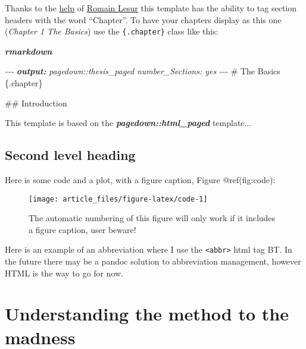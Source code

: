 \documentclass[
]{article}
\newenvironment{Shaded}{\begin{snugshade}}{\end{snugshade}}
\newcommand{\AnnotationTok}[1]{\textcolor[rgb]{0.56,0.35,0.01}{\textbf{\textit{#1}}}}
\newcommand{\CommentTok}[1]{\textcolor[rgb]{0.56,0.35,0.01}{\textit{#1}}}
\newcommand{\FunctionTok}[1]{\textcolor[rgb]{0.00,0.00,0.00}{#1}}
\newcommand{\InformationTok}[1]{\textcolor[rgb]{0.56,0.35,0.01}{\textbf{\textit{#1}}}}
\newcommand{\NormalTok}[1]{#1}
\begin{document}
Thanks to the
\href{https://github.com/rstudio/pagedown/issues/101}{help} of
\href{https://github.com/RLesur}{Romain Lesur} this template has the
ability to tag section headers with the word ``Chapter''. To have your
chapters display as this one (\emph{Chapter 1 The Basics}) use the
\texttt{\{.chapter\}} class like this:

\emph{\textbf{rmarkdown}}

\begin{Shaded}
\begin{Highlighting}[]
\CommentTok{{-}{-}{-}}
\AnnotationTok{output:}
\CommentTok{  pagedown::thesis\_paged}
\CommentTok{    number\_Sections: yes}
\CommentTok{{-}{-}{-}}
\FunctionTok{\# The Basics \{.chapter\}}

\FunctionTok{\#\# Introduction}

\NormalTok{This template is based on the }\InformationTok{\textasciigrave{}pagedown::html\_paged\textasciigrave{}}\NormalTok{ template...}
\end{Highlighting}
\end{Shaded}

\hypertarget{second-level-heading}{%
\subsection{Second level heading}\label{second-level-heading}}

Here is some code and a plot, with a figure caption, Figure
@ref(fig:code):

\begin{figure}

{\centering \texttt{[image: article\_files/figure-latex/code-1]} 

}

\caption{The automatic numbering of this figure will only work if it includes a figure caption, user beware!}\label{fig:code}
\end{figure}

Here is an example of an abbreviation where I use the
\texttt{\textless{}abbr\textgreater{}} html tag BT. In the future there
may be a pandoc solution to abbreviation management, however HTML is the
way to go for now.

\hypertarget{understanding-the-method-to-the-madness}{%
\section{Understanding the method to the
madness}\label{understanding-the-method-to-the-madness}}
\end{document}
